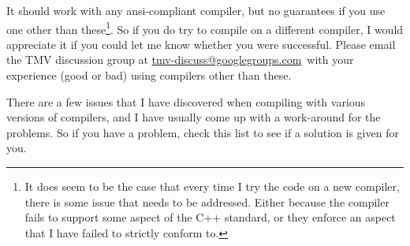 \documentclass[twoside,letterpaper,11pt]{article}
\makeatletter
\newcommand{\mygroupx}{tmv-discuss@googlegroups.com}
\newcommand{\mygroup}{\href{mailto:\mygroupx}{\mygroupx}}
\makeatother
\begin{document}
It should work with any ansi-compliant
compiler, but no guarantees if you use one other than these\footnote{
It does seem to be the case that 
every time I try the code on a new compiler, there is some issue that needs to be addressed.  
Either because the compiler fails to support some aspect of the C++ standard, or they enforce
an aspect that I have failed to strictly conform to.}.
  So if you do try to compile on a different compiler, 
I would appreciate it if you could let me know whether you were successful.  
Please email the TMV discussion group at \mygroup\ with your experience (good or bad) using 
compilers other than these.

There are a few issues that I have discovered when compiling with various 
versions of compilers, and I have usually come up with a work-around for
the problems.  So if you have a problem, check this list to see if a solution
is given for you.  
\end{document}

